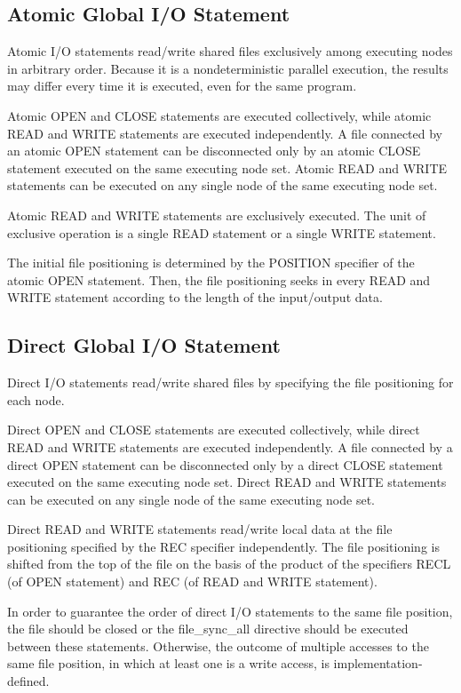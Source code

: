    \subsection{Atomic Global I/O Statement}

   Atomic I/O statements read/write shared files exclusively among executing nodes
   in arbitrary order.
   Because it is a nondeterministic parallel execution,
   the results may differ every time it is executed, even for the same program.

   Atomic OPEN and CLOSE statements are executed collectively, while atomic
   READ and WRITE statements are executed independently.
   A file connected by an atomic OPEN statement can be disconnected only by an
   atomic CLOSE statement executed on the same executing node set.
   Atomic READ and WRITE statements can be executed on any single node of the
   same executing node set.

   Atomic READ and WRITE statements are exclusively executed.
   The unit of exclusive operation is a single READ statement or a single WRITE
   statement.

   The initial file positioning is determined by the POSITION specifier of
   the atomic OPEN statement.
   Then, the file positioning seeks in every READ and WRITE statement 
   according to the length of the input/output data.


   \subsection{Direct Global I/O Statement}

   Direct I/O statements read/write shared files by specifying the
   file positioning for each node.

   Direct OPEN and CLOSE statements are executed collectively, while direct
   READ and WRITE statements are executed independently.
   A file connected by a direct OPEN statement can be disconnected only by a
   direct CLOSE statement executed on the same executing node set.
   Direct READ and WRITE statements can be executed on any single node of the
   same executing node set.
   
   Direct READ and WRITE statements read/write local data at the file positioning
   specified by the REC specifier independently.
   The file positioning is shifted from the top of the file on the basis
   of the product of the specifiers RECL (of OPEN statement) and
   REC (of READ and WRITE statement). 

   In order to guarantee the order of direct I/O statements to the same
   file position, the file should be closed or the file\_sync\_all
   directive should be executed between these statements. Otherwise, the
   outcome of multiple accesses to the same file position, in which at
   least one is a write access, is implementation-defined.


